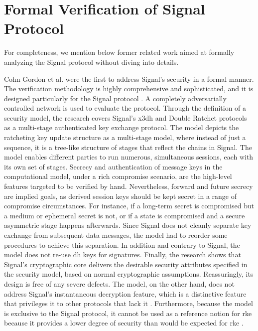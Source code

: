 \section{Formal Verification of Signal Protocol}
For completeness, we mention below former related work aimed at formally analyzing the Signal protocol without diving into details.
\par
Cohn-Gordon et al. \cite{cohn2020formal} were the first to address Signal's security in a formal manner. The verification methodology is highly comprehensive and sophisticated, and it is designed particularly for the Signal protocol \cite{alwen_coretti_dodis_2020}. A completely adversarially controlled network is used to evaluate the protocol. Through the definition of a security model, the research covers Signal's \gls{x3dh} and Double Ratchet protocols as a multi-stage authenticated key exchange protocol. The model depicts the ratcheting key update structure as a multi-stage model, where instead of just a sequence, it is a tree-like structure of stages that reflect the chains in Signal. The model enables different parties to run numerous, simultaneous sessions, each with its own set of stages. Secrecy and authentication of message keys in the computational model, under a rich compromise scenario, are the high-level features targeted to be verified by hand. Nevertheless, forward and future secrecy are implied goals, as derived session keys should be kept secret in a range of compromise circumstances. For instance, if a long-term secret is compromised but a medium or ephemeral secret is not, or if a state is compromised and a secure asymmetric stage happens afterwards. Since Signal does not cleanly separate key exchange from subsequent data messages, the model had to reorder some procedures to achieve this separation. In addition and contrary to Signal, the model does not re-use \gls{dh} keys for signatures. Finally, the research shows that Signal's cryptographic core delivers the desirable security attributes specified in the security model, based on normal cryptographic assumptions. Reassuringly, its design is free of any severe defects. The model, on the other hand, does not address Signal's instantaneous decryption feature, which is a distinctive feature that privileges it to other protocols that lack it \cite{alwen_coretti_dodis_2020}. Furthermore, because the model is exclusive to the Signal protocol, it cannot be used as a reference notion for \gls{rke} because it provides a lower degree of security than would be expected for \gls{rke} \cite{poettering2018asynchronous}.

